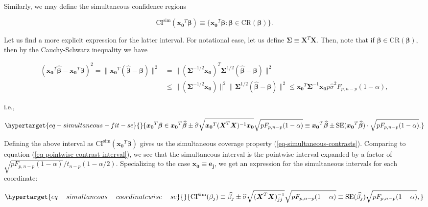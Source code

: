 \documentclass[
  11pt,
  letterpaper,
  oneside]{book}
\theoremstyle{definition}
\theoremstyle{plain}
\theoremstyle{plain}
\theoremstyle{plain}
\theoremstyle{remark}
\begin{document}
Similarly, we may define the simultaneous confidence regions

\[
\text{CI}^{\text{sim}}(\boldsymbol{x_0}^T \boldsymbol{\beta}) \equiv \{\boldsymbol{x_0}^T \boldsymbol{\beta}: \boldsymbol{\beta} \in \text{CR}(\boldsymbol{\beta})\}.
\]

Let us find a more explicit expression for the latter interval. For
notational ease, let us define
\(\boldsymbol{\Sigma} \equiv \boldsymbol{X}^T \boldsymbol{X}\). Then,
note that if \(\boldsymbol{\beta} \in \text{CR}(\boldsymbol{\beta})\),
then by the Cauchy-Schwarz inequality we have

\[
\begin{split}
(\boldsymbol{x_0}^T \boldsymbol{\widehat{\beta}}-\boldsymbol{x_0}^T \boldsymbol{\beta})^2 = \|\boldsymbol{x_0}^T (\boldsymbol{\widehat{\beta}}-\boldsymbol{\beta})\|^2 &= \|(\boldsymbol{\Sigma}^{-1/2}\boldsymbol{x_0})^T \boldsymbol{\Sigma}^{1/2}(\boldsymbol{\widehat{\beta}}-\boldsymbol{\beta})\|^2 \\
&\leq \|(\boldsymbol{\Sigma}^{-1/2}\boldsymbol{x_0})\|^2\|\boldsymbol{\Sigma}^{1/2}(\boldsymbol{\widehat{\beta}}-\boldsymbol{\beta})\|^2 \leq \boldsymbol{x_0}^T \boldsymbol{\Sigma}^{-1}\boldsymbol{x_0} p \widehat{\sigma}^2 F_{p, n-p}(1-\alpha),
\end{split}
\]

i.e.,

\begin{equation}\protect\hypertarget{eq-simultaneous-fit-se}{}{
\boldsymbol{x_0}^T \boldsymbol{\beta} \in \boldsymbol{x_0}^T \boldsymbol{\widehat{\beta}} \pm \widehat{\sigma} \sqrt{\boldsymbol{x_0}^T (\boldsymbol{X}^T \boldsymbol{X})^{-1}\boldsymbol{x_0}} \sqrt{pF_{p, n-p}(1-\alpha)} \equiv \boldsymbol{x_0}^T \boldsymbol{\widehat{\beta}} \pm \text{SE}(\boldsymbol{x_0}^T \boldsymbol{\widehat{\beta}})\cdot\sqrt{pF_{p, n-p}(1-\alpha)}.
}\label{eq-simultaneous-fit-se}\end{equation}

Defining the above interval as
\(\text{CI}^{\text{sim}}(\boldsymbol{x_0}^T \boldsymbol{\beta})\) gives
us the simultaneous coverage property (\ref{eq-simultaneous-contrasts}).
Comparing to equation (\ref{eq-pointwise-contrast-interval}), we see
that the simultaneous interval is the pointwise interval expanded by a
factor of \(\sqrt{pF_{p, n-p}(1-\alpha)}/t_{n-p}(1-\alpha/2)\).
Specializing to the case \(\boldsymbol{x_0} \equiv \boldsymbol{e_j}\),
we get an expression for the simultaneous intervals for each coordinate:

\begin{equation}\protect\hypertarget{eq-simultaneous-coordinatewise-se}{}{
\text{CI}^{\text{sim}}(\beta_j) \equiv \widehat{\beta_j} \pm \widehat{\sigma} \sqrt{(\boldsymbol{X}^T \boldsymbol{X})^{-1}_{jj}} \sqrt{pF_{p, n-p}(1-\alpha)} \equiv \text{SE}(\widehat{\beta_j})\sqrt{pF_{p, n-p}(1-\alpha)},
}\label{eq-simultaneous-coordinatewise-se}\end{equation}
\end{document}
